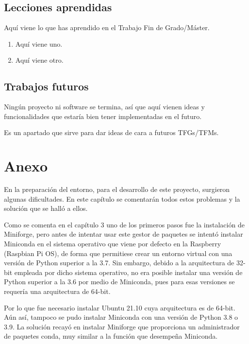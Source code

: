 \documentclass[a4paper, 12pt]{book}
\begin{document}
\section{Lecciones aprendidas}
\label{sec:lecciones_aprendidas}

Aquí viene lo que has aprendido en el Trabajo Fin de Grado/Máster.

\begin{enumerate}
  \item Aquí viene uno.
  \item Aquí viene otro.
\end{enumerate}


\section{Trabajos futuros}
\label{sec:trabajos_futuros}

Ningún proyecto ni software se termina, así que aquí vienen ideas y funcionalidades que estaría bien tener implementadas en el futuro.

Es un apartado que sirve para dar ideas de cara a futuros TFGs/TFMs.

\chapter{Anexo}
\label{chap:anexo}

En la preparación del entorno, para el desarrollo de este proyecto, surgieron algunas dificultades. En este capítulo se comentarán todos estos problemas y la solución que se halló a ellos.

Como se comenta en el capítulo 3 uno de los primeros pasos fue la instalación de Miniforge, pero antes de intentar usar este gestor de paquetes se intentó instalar Miniconda en el sistema operativo que viene por defecto en la Raspberry (Raspbian Pi OS), de forma que permitiese crear un entorno virtual con una versión de Python superior a la 3.7. Sin embargo, debido a la arquitectura de 32-bit empleada por dicho sistema operativo, no era posible instalar una versión de Python superior a la 3.6 por medio de Miniconda, pues para esas versiones se requería una arquitectura de 64-bit.

Por lo que fue necesario instalar Ubuntu 21.10 cuya arquitectura es de 64-bit. Aún así, tampoco se pudo instalar Miniconda con una versión de Python 3.8 o 3.9. La solución recayó en instalar Miniforge que proporciona un administrador de paquetes conda, muy similar a la función que desempeña Miniconda.
\end{document}
